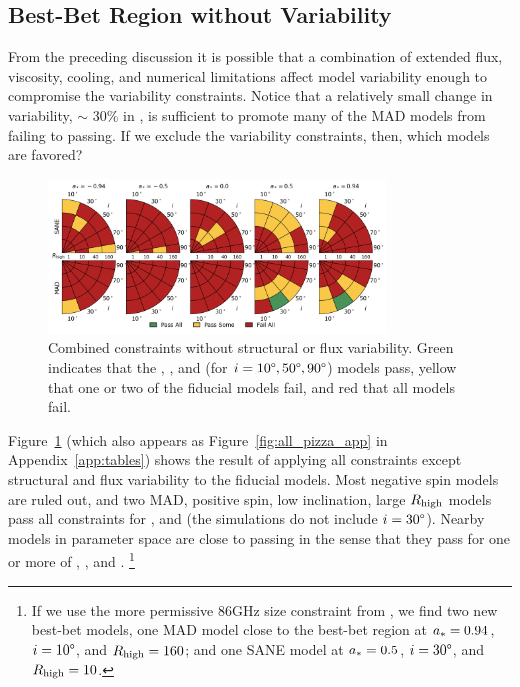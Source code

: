 \subsection{Best-Bet Region without Variability}

From the preceding discussion it is possible that a combination of extended flux, viscosity, cooling, and numerical limitations affect model variability enough to compromise the variability constraints.
Notice that a relatively small change in variability, $\sim$ 30\% in , is sufficient to promote many of the MAD models from failing to passing.
If we exclude the variability constraints, then, which models are favored?

\begin{figure}
  \centering
  \includegraphics[width=0.8\textwidth]{./figures/All_Constraints.png}
  \caption{Combined constraints without structural or flux variability.
Green indicates that the \kharma, \bhac, and (for $i = 10\degree, 50\degree, 90\degree$) \hamr models pass, yellow that one or two of the fiducial models fail, and red that all models fail.}
  \label{fig:all_pizza}
\end{figure}

Figure~\ref{fig:all_pizza} (which also appears as  Figure~\ref{fig:all_pizza_app} in Appendix~\ref{app:tables}) shows the result of applying all constraints except structural and flux variability to the fiducial models.
Most negative spin models are ruled out, and two MAD, positive spin, low inclination, large $R_\mathrm{high}$ models pass all constraints for \kharma, and \bhac (the \hamr simulations do not include $i = 30\degree$).
Nearby models in parameter space are close to passing in the sense that they pass for one or more of \kharma, \bhac, and \hamr. \footnote{If we use the more permissive 86GHz size constraint from \cite{2019ApJ...871...30I}, we find two new best-bet models, one MAD model close to the best-bet region at  $a_* = 0.94$, $i = 10 \degree$, and $R_\mathrm{high} = 160$; and one SANE model at $a_* = 0.5$, $i = 30 \degree$, and $R_\mathrm{high} = 10$.}

